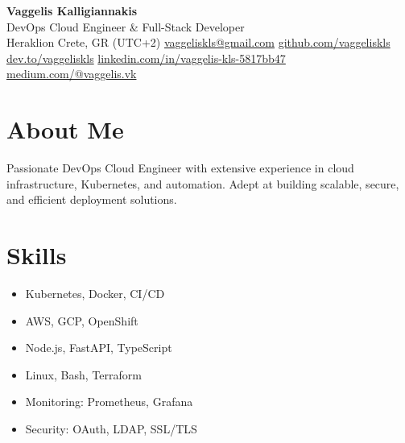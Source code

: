 \documentclass[a4paper,10pt]{article}
\begin{document}
\pagestyle{empty}

\begin{center}
    {\huge \textbf{Vaggelis Kalligiannakis} } \\
    \vspace{7pt}
    {\large DevOps Cloud Engineer \& Full-Stack Developer} \\
    \vspace{7pt}
     Heraklion Crete, GR (UTC+2) \quad
     \href{mailto:vaggeliskls@gmail.com}{vaggeliskls@gmail.com} \quad
     \href{https://github.com/vaggeliskls}{github.com/vaggeliskls} \quad
     \href{https://dev.to/vaggeliskls}{dev.to/vaggeliskls} \quad
     \href{https://www.linkedin.com/in/vaggelis-kls-5817bb47/}{linkedin.com/in/vaggelis-kls-5817bb47} \quad
     \href{https://medium.com/@vaggelis.vk}{medium.com/@vaggelis.vk}
\end{center}

\vspace{2pt}

\section*{ About Me}
Passionate DevOps Cloud Engineer with extensive experience in cloud infrastructure, Kubernetes, and automation. Adept at building scalable, secure, and efficient deployment solutions.

\vspace{0pt}

\section*{ Skills}
\begin{itemize}[left=0pt, label=]
    \item Kubernetes, Docker, CI/CD
    \item AWS, GCP, OpenShift
    \item Node.js, FastAPI, TypeScript
    \item Linux, Bash, Terraform
    \item Monitoring: Prometheus, Grafana
    \item Security: OAuth, LDAP, SSL/TLS
\end{itemize}

\vspace{0pt}
\end{document}
